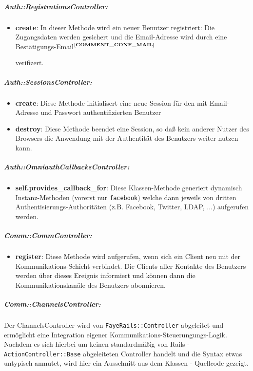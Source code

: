 \subparagraph{Auth::RegistrationsController:}
\begin{itemize}[leftmargin=*,noitemsep,topsep=1ex,parsep=0pt,partopsep=0pt]
\item \textbf{create}: In dieser Methode wird ein neuer Benutzer registriert: Die Zugangsdaten werden gesichert und die Email-Adresse wird durch eine Bestätigungs-Email$^{\textbf{\ref{COMMENT_CONF_MAIL}}}$%
\addtocounter{footnote}{1}%
verifizert.
\end{itemize}
\subparagraph{Auth::SessionsController:}
\begin{itemize}[leftmargin=*,noitemsep,topsep=1ex,parsep=0pt,partopsep=0pt]
\item \textbf{create}: Diese Methode initialisert eine neue Session für den mit Email-Adresse und Passwort authentifizierten Benutzer 
\item \textbf{destroy}: Diese Methode beendet eine Session, so daß kein anderer Nutzer des Browsers die Anwendung mit der Authentität des Benutzers weiter nutzen kann.
\end{itemize}
\subparagraph{Auth::OmniauthCallbacksController:}
\begin{itemize}[leftmargin=*,noitemsep,topsep=1ex,parsep=0pt,partopsep=0pt]
\item \textbf{self.provides\_callback\_for}: Diese Klassen-Methode generiert dynamisch Instanz-Methoden (vorerst nur \texttt{facebook}) welche dann jeweils von dritten Authentisierungs-Authoritäten (z.B. Facebook, Twitter, LDAP, ...) aufgerufen werden. 
\end{itemize}
\subparagraph{Comm::CommController:}
\begin{itemize}[leftmargin=*,noitemsep,topsep=1ex,parsep=0pt,partopsep=0pt]
\item \textbf{register}: Diese Methode wird aufgerufen, wenn sich ein Client neu mit der Kommunikations-Schicht verbindet.
Die Clients aller Kontakte des Benutzers werden über dieses Ereignis informiert und können dann die Kommunikationskanäle des Benutzers abonnieren.
\end{itemize}
\subparagraph{Comm::ChannelsController:}\label{CTRLS_CHANNEL}
Der ChannelsController wird von \texttt{FayeRails::Controller} abgeleitet und ermöglicht eine Integration eigener Kommunikations-Steuerungungs-Logik. Nachdem es sich hierbei um keinen standardmäßig von Rails - \texttt{ActionController::Base} abgeleiteten Controller handelt und die Syntax etwas untypisch anmutet, wird hier ein Ausschnitt aus dem Klassen - Quellcode gezeigt. \\
